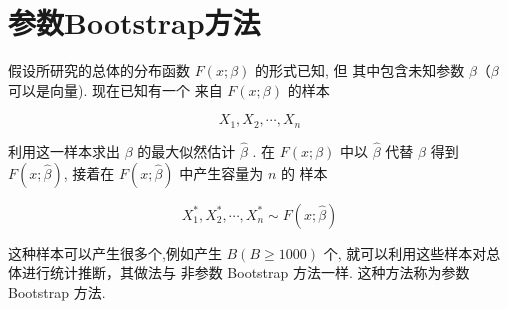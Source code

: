 \section{参数Bootstrap方法}

假设所研究的总体的分布函数 $ F(x ; \beta) $ 的形式已知, 但 其中包含未知参数 $ \beta （ \beta $ 可以是向量). 现在已知有一个 来自 $ F(x ; \beta) $ 的样本

$$ X_{1}, X_{2}, \cdots, X_{n} $$

利用这一样本求出 $ \beta $ 的最大似然估计 $ \hat{\beta} $ . 在 $ F(x ; \beta) $ 中以 $ \hat{\beta} $ 代替 $ \beta $ 得到 $ F(x ; \hat{\beta}) $, 接着在 $ F(x ; \hat{\beta}) $ 中产生容量为 $ n $ 的 样本

$$ X_{1}^{*}, X_{2}^{*}, \cdots, X_{n}^{*} \sim F(x ; \hat{\beta}) $$

这种样本可以产生很多个,例如产生 $ B(B \geq 1000) $ 个, 就可以利用这些样本对总体进行统计推断，其做法与 非参数 Bootstrap 方法一样. 这种方法称为参数 Bootstrap 方法. 